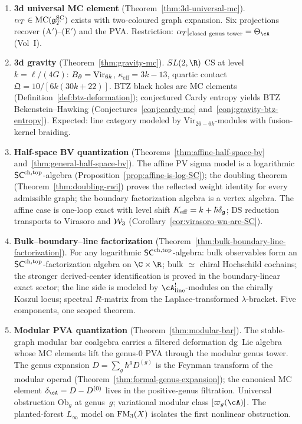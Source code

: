 \begin{enumerate}[label=\textbf{(\Alph*$'$)},leftmargin=2.5em]
\item \textbf{3d universal MC element}
 (Theorem~\ref{thm:3d-universal-mc}).
 $\alpha_T \in \operatorname{MC}(\mathfrak{g}^{\mathrm{SC}}_T)$ exists with two-coloured graph
 expansion. Six projections recover (A$'$)--(E$'$) and the
 PVA\@. Restriction:
 $\alpha_T|_{\text{closed genus tower}} = \Theta_\cA$ (Vol~I).

\item \textbf{3d gravity}
 (Theorem~\ref{thm:gravity-mc}).
 $SL(2,\R)$ CS at level $k = \ell/(4G)$:
 $B_{\partial} = \mathrm{Vir}_{6k}$,
 $\kappa_{\mathrm{eff}} = 3k-13$, quartic contact
 $\mathfrak{Q} = 10/[6k(30k+22)]$.
 BTZ black holes are MC elements
 (Definition~\ref{def:btz-deformation});
 conjectured Cardy entropy yields BTZ Bekenstein--Hawking
 (Conjectures~\ref{conj:cardy-mc}
 and~\ref{conj:gravity-btz-entropy}).
 Expected: line category modeled by
 $\mathrm{Vir}_{26-6k}$-modules with fusion-kernel braiding.
\item \textbf{Half-space BV quantization}
 (Theorems~\ref{thm:affine-half-space-bv}
 and~\ref{thm:general-half-space-bv}).
 The affine PV sigma model is a logarithmic
 $\mathsf{SC}^{\mathrm{ch,top}}$-algebra
 (Proposition~\ref{prop:affine-is-log-SC}); the doubling
 theorem (Theorem~\ref{thm:doubling-rwi}) proves the reflected
 weight identity for every admissible graph; the boundary
 factorization algebra is a vertex algebra. The affine case is
 one-loop exact with level shift $K_{\mathrm{eff}} = k +
 \hbar\delta_{\mathfrak{g}}$; DS reduction transports to Virasoro and
 $\mathcal{W}_3$ (Corollary~\ref{cor:virasoro-wn-are-SC}).

\item \textbf{Bulk--boundary--line factorization}
 (Theorem~\ref{thm:bulk-boundary-line-factorization}).
 For any logarithmic $\mathsf{SC}^{\mathrm{ch,top}}$-algebra: bulk observables form
 an $\mathsf{SC}^{\mathrm{ch,top}}$-factorization algebra on $\C \times \R$;
 bulk $\simeq$ chiral Hochschild cochains; the stronger
 derived-center identification is proved in the boundary-linear
 exact sector; the line side is modeled by
 $\cA^!_{\mathrm{line}}$-modules on the chirally Koszul locus;
 spectral $R$-matrix from the
 Laplace-transformed $\lambda$-bracket. Five components,
 one scoped theorem.

\item \textbf{Modular PVA quantization}
 (Theorem~\ref{thm:modular-bar}).
 The stable-graph modular bar coalgebra carries a filtered
 deformation dg~Lie algebra whose MC elements lift the genus-$0$
 PVA through the modular genus tower. The genus expansion $D = \sum_g \hbar^g
 D^{(g)}$ is the Feynman transform of the modular operad
 (Theorem~\ref{thm:formal-genus-expansion}); the canonical MC
 element $\delta_\cA = D - D^{(0)}$ lives in the positive-genus
 filtration. Universal obstruction $\mathrm{Ob}_g$ at
 genus~$g$; variational modular class $[\varpi_g(\cA)]$.
 The planted-forest $L_\infty$ model on $\operatorname{FM}_3(X)$ isolates the
 first nonlinear obstruction.


\end{enumerate}
